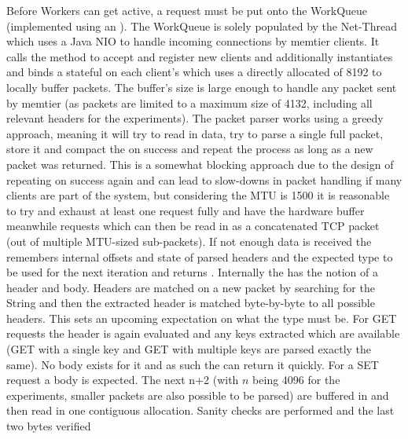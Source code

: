     Before Workers can get active, a request must be put onto the WorkQueue (implemented using an
    ). The WorkQueue is solely populated by the Net-Thread which uses a Java NIO
     to handle incoming connections by memtier clients. It calls the  method to
    accept and register new clients and additionally instantiates and binds a stateful  on each
    client's  which uses a directly allocated  of \SI{8192}{\mybyte} to locally buffer
    packets. The buffer's size is large enough to handle any packet sent by memtier (as packets are limited to a maximum
    size of \SI{4132}{\mybyte}, including all relevant headers for the experiments).  The packet parser works using a
    greedy approach, meaning it will try to read in data, try to parse a single full packet, store it and compact the
     on success and repeat the process as long as a new packet was returned.\newline
    This is a somewhat blocking approach due to the design of repeating on success again and can lead to slow-downs in
    packet handling if many clients are part of the system, but considering the MTU is \SI{1500}{\mybyte} it is
    reasonable to try and exhaust at least one request fully and have the hardware buffer meanwhile requests which can
    then be read in as a concatenated TCP packet (out of multiple MTU-sized sub-packets). If not enough data is
    received the  remembers internal offsets and state of parsed headers and the expected type to be
    used for the next iteration and returns .\newline
    Internally the  has the notion of a header and body. Headers are matched on a new packet by
    searching for the String  and then the extracted header is matched
    byte-by-byte to all possible headers. This sets an upcoming expectation on what the type must be. For GET requests
    the header is again evaluated and any keys extracted which are available (GET with a single key and GET with
    multiple keys are parsed exactly the same). No body exists for it and as such the  can return it
    quickly. For a SET request a body is expected. The next \SI[number-math-rm = \mathnormal, parse-numbers =
    false]{n+2}{\mybyte} (with $n$ being 4096 for the experiments, smaller packets are also possible to be parsed) are
    buffered in and then read in one contiguous allocation. Sanity checks are performed and the last two bytes verified
